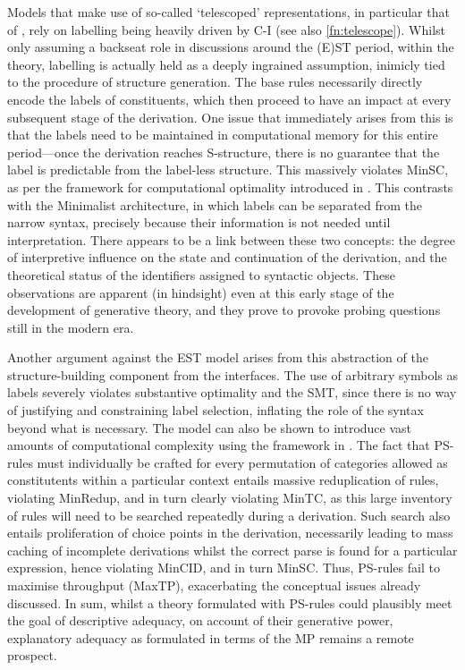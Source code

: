 Models that make use of so-called `telescoped' representations, in particular that of \textcite{AdgerD_2013}, rely on labelling being heavily driven by C-I (see also \autoref{fn:telescope}). Whilst only assuming a backseat role in discussions around the (E)ST period, within the theory, labelling is actually held as a deeply ingrained assumption, inimicly tied to the procedure of structure generation. The base rules necessarily directly encode the labels of constituents, which then proceed to have an impact at every subsequent stage of the derivation. One issue that immediately arises from this is that the labels need to be maintained in computational memory for this entire period---once the derivation reaches S-structure, there is no guarantee that the label is predictable from the label-less structure. This massively violates MinSC, as per the framework for computational optimality introduced in . This contrasts with the Minimalist architecture, in which labels can be separated from the narrow syntax, precisely because their information is not needed until interpretation. There appears to be a link between these two concepts: the degree of interpretive influence on the state and continuation of the derivation, and the theoretical status of the identifiers assigned to syntactic objects. These observations are apparent (in hindsight) even at this early stage of the development of generative theory, and they prove to provoke probing questions still in the modern era.

Another argument against the EST model arises from this abstraction of the structure-building component from the interfaces. The use of arbitrary symbols as labels severely violates substantive optimality and the SMT, since there is no way of justifying and constraining label selection, inflating the role of the syntax beyond what is necessary. The model can also be shown to introduce vast amounts of computational complexity using the framework in . The fact that PS-rules must individually be crafted for every permutation of categories allowed as constitutents within a particular context entails massive reduplication of rules, violating MinRedup, and in turn clearly violating MinTC, as this large inventory of rules will need to be searched repeatedly during a derivation. Such search also entails proliferation of choice points in the derivation, necessarily leading to mass caching of incomplete derivations whilst the correct parse is found for a particular expression, hence violating MinCID, and in turn MinSC. Thus, PS-rules fail to maximise throughput (MaxTP), exacerbating the conceptual issues already discussed. In sum, whilst a theory formulated with PS-rules could plausibly meet the goal of descriptive adequacy, on account of their generative power, explanatory adequacy as formulated in terms of the MP remains a remote prospect.

